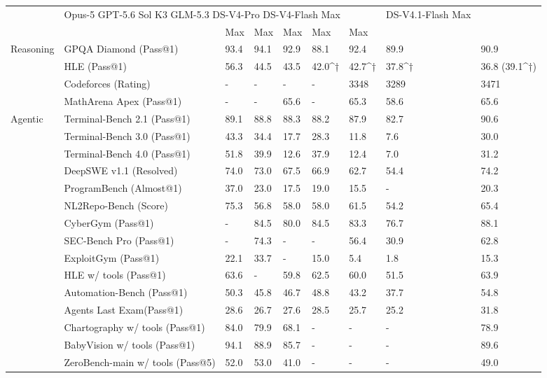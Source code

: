 \documentclass[
  10
]{article}
\newcounter{none} %
\begin{document}
{\def\LTcaptype{none} %
\begin{longtable}[]{@{}lllllllll@{}}
\toprule\noalign{}
\endhead
\bottomrule\noalign{}
\endlastfoot
\multicolumn{2}{@{}l}{%
\multirow{2}{*}{Benchmark (Metric)}} & \multicolumn{6}{l}{%
Opus-5 GPT-5.6 Sol K3 GLM-5.3 DS-V4-Pro DS-V4-Flash Max} &
\multirow{2}{*}{DS-V4.1-Flash Max} \\
& & Max & Max & Max & Max & Max & Max \\
\multirow{4}{*}{Reasoning} & GPQA Diamond (Pass@1) & 93.4 & 94.1 & 92.9
& 88.1 & 92.4 & 89.9 & 90.9 \\
& HLE (Pass@1) & 56.3 & 44.5 & 43.5 & 42.0\^{}† & 42.7\^{}† & 37.8\^{}†
& 36.8 (39.1\^{}†) \\
& Codeforces (Rating) & - & - & - & - & 3348 & 3289 & 3471 \\
& MathArena Apex (Pass@1) & - & - & 65.6 & - & 65.3 & 58.6 & 65.6 \\
\multirow{15}{*}{Agentic} & Terminal-Bench 2.1 (Pass@1) & 89.1 & 88.8 &
88.3 & 88.2 & 87.9 & 82.7 & 90.6 \\
& Terminal-Bench 3.0 (Pass@1) & 43.3 & 34.4 & 17.7 & 28.3 & 11.8 & 7.6 &
30.0 \\
& Terminal-Bench 4.0 (Pass@1) & 51.8 & 39.9 & 12.6 & 37.9 & 12.4 & 7.0 &
31.2 \\
& DeepSWE v1.1 (Resolved) & 74.0 & 73.0 & 67.5 & 66.9 & 62.7 & 54.4 &
74.2 \\
& ProgramBench (Almost@1) & 37.0 & 23.0 & 17.5 & 19.0 & 15.5 & - &
20.3 \\
& NL2Repo-Bench (Score) & 75.3 & 56.8 & 58.0 & 58.0 & 61.5 & 54.2 &
65.4 \\
& CyberGym (Pass@1) & - & 84.5 & 80.0 & 84.5 & 83.3 & 76.7 & 88.1 \\
& SEC-Bench Pro (Pass@1) & - & 74.3 & - & - & 56.4 & 30.9 & 62.8 \\
& ExploitGym (Pass@1) & 22.1 & 33.7 & - & 15.0 & 5.4 & 1.8 & 15.3 \\
& HLE w/ tools (Pass@1) & 63.6 & - & 59.8 & 62.5 & 60.0 & 51.5 & 63.9 \\
& Automation-Bench (Pass@1) & 50.3 & 45.8 & 46.7 & 48.8 & 43.2 & 37.7 &
54.8 \\
& Agents\textquotesingle{} Last Exam(Pass@1) & 28.6 & 26.7 & 27.6 & 28.5
& 25.7 & 25.2 & 31.8 \\
& Chartography w/ tools (Pass@1) & 84.0 & 79.9 & 68.1 & - & - & - &
78.9 \\
& BabyVision w/ tools (Pass@1) & 94.1 & 88.9 & 85.7 & - & - & - &
89.6 \\
& ZeroBench-main w/ tools (Pass@5) & 52.0 & 53.0 & 41.0 & - & - & - &
49.0 \\
\end{longtable}
}
\end{document}
